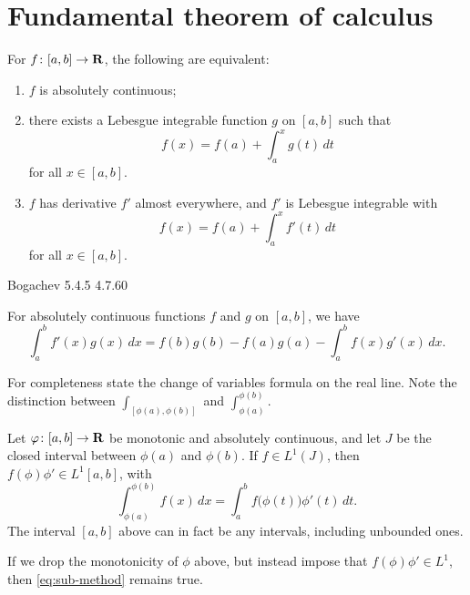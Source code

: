 \section{Fundamental theorem of calculus}
\begin{namedthm}
    For $f\colon [a,b]\to \mathbf{R}$, the following are equivalent: 
    \begin{enumerate}
        \item $f$ is absolutely continuous; 
        \item there exists a Lebesgue integrable function $g$ on $[a,b]$ such that \[
            f(x) = f(a) + \int_a^x g(t)\,dt
        \] for all $x \in [a,b]$.
        \item $f$ has derivative $f'$ almost everywhere, and $f'$ is Lebesgue integrable with \[
            f(x) = f(a) + \int_{a}^x f'(t)\,dt
        \] for all $x \in [a,b]$.
    \end{enumerate}
\end{namedthm}

Bogachev 5.4.5 4.7.60

\begin{namedthm}
    For absolutely continuous functions $f$ and $g$ on $[a,b]$, we have \[
        \int_a^b f'(x)g(x)\,dx = f(b)g(b) - f(a)g(a) - \int_a^bf(x)g'(x)\,dx.
    \]
\end{namedthm}


For completeness state the change of variables formula on the real line. Note the distinction between $\int_{[\phi(a),\phi(b)]}$ and $\int_{\phi(a)}^{\phi(b)}$.
\begin{namedthm}
    Let $\varphi\colon [a,b]\to \mathbf{R}$ be monotonic and absolutely continuous, and let $J$ be the closed interval between $\phi(a)$ and $\phi(b)$. If $f\in L^1(J)$, then $f(\phi) \phi' \in L^1[a,b]$, with \begin{equation} \label{eq:sub-method}
        \int_{\phi(a)}^{\phi(b)} f(x)\,dx = \int_{a}^b f\bigl(\phi(t)\bigr)\phi'(t)\,dt.
    \end{equation}
    The interval $[a,b]$ above can in fact be any intervals, including unbounded ones.
    
    If we drop the monotonicity of $\phi$ above, but instead impose that $f(\phi)\phi'\in L^1$, then \eqref{eq:sub-method} remains true.
\end{namedthm}

